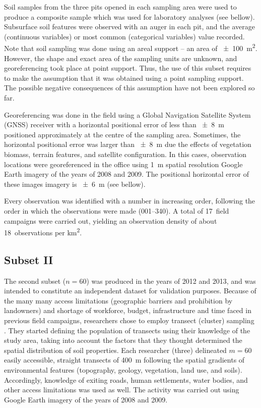 Soil samples from the three pits opened in each sampling area were used to produce a composite sample
which was used for laboratory analyses (see bellow). Subsurface soil features were observed with an auger 
in each pit, and the average (continuous variables) or most common (categorical variables) value recorded.
Note that soil sampling was done using an areal support -- an area of \SI{\pm100}{\metre\squared}. However, 
the shape and exact area of the sampling units are unknown, and georeferencing took place at point 
support. Thus, the use of this subset requires to make the assumption that it was obtained using a point
sampling support. The possible negative consequences of this assumption have not been explored so far.

Georeferencing was done in the field using a Global Navigation Satellite System (GNSS) receiver with a 
horizontal positional error of less than \SI{\pm8}{\metre} positioned approximately at the centre of the
sampling area. Sometimes, the horizontal positional error was larger than \SI{\pm8}{\metre} due the effects
of vegetation biomass, terrain features, and satellite configuration. In this cases, observation locations 
were georeferenced in the office using \SI{1}{\metre} spatial resolution Google Earth\textregistered{} 
imagery of the years of 2008 and 2009. The positional horizontal error of these images imagery is 
\SI{\pm6}{\metre} (see bellow).

Every observation was identified with a number in increasing order, following the order in which 
the observations were made (\num{001}--\num{340}). A total of \num{17}~field campaigns were carried out,
yielding an observation density of about \num{18}~observations per \si{\kilo\metre\squared}.

\tocless\subsection{Subset II}

The second subset ($n = 60$) was produced in the years of \num{2012} and \num{2013}, and was intended to 
constitute an independent dataset for validation purposes. Because of the many many access limitations 
(geographic barriers and prohibition by landowners) and shortage of workforce, budget, infrastructure and 
time faced in previous field campaigns, researchers chose to employ transect (cluster) sampling 
\cite{MiguelEtAl2012,Moura-BuenoEtAl2012,Samuel-RosaEtAl2013}. They started defining the population of 
transects using their knowledge of the study area, taking into account the factors that they thought 
determined the spatial distribution of soil properties. Each researcher (three) delineated $m = 60$ easily 
accessible, straight transects of \SI{400}{\metre} following the spatial gradients of environmental features 
(topography, geology, vegetation, land use, and soils). Accordingly, knowledge of exiting roads, human 
settlements, water bodies, and other access limitations was used as well. The activity was carried out using 
Google Earth\textregistered{} imagery of the years of \num{2008} and \num{2009}.

